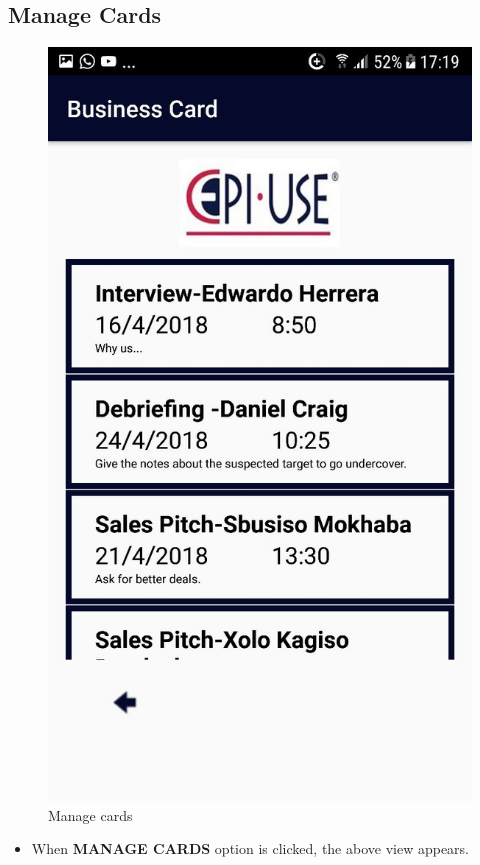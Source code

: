 \documentclass[english]{article}
\begin{document}
\subsection{Manage Cards}
		\begin{figure}[H]
			\centering
			\includegraphics[scale=0.3]{Manage_Card.jpg}
			\caption{Manage cards}
			\label{figure: 6}
		\end{figure}
		\begin{itemize}
			\item When \textbf{MANAGE CARDS} option is clicked, the above view appears. 
		\end{itemize}
		
\end{document}
